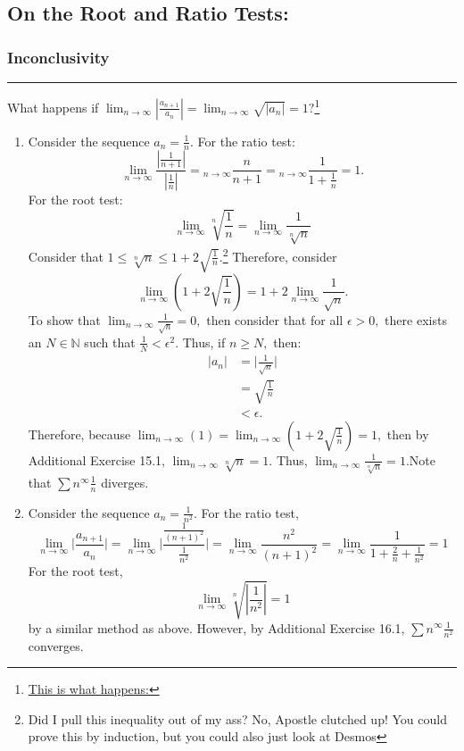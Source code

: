 \documentclass[openany, amssymb, psamsfonts]{amsart}
\newcommand{\bbN}{\mathbb{N}}
\newcommand{\abs}[1]{\lvert #1 \rvert}
\theoremstyle{definition}
\numberwithin{equation}{section}
\begin{document}
\subsection*{ On the Root and Ratio Tests:}
\subsubsection*{Inconclusivity}
\vspace{4pt}     \hrule   \vspace{4pt} What happens if $\lim_{n\to \infty}\left|\frac{a_{n+1}}{a_n}\right| = \lim_{n\to \infty}\sqrt{\abs{a_n}} = 1?$\footnote{ \href{https://media.istockphoto.com/id/1250210811/photo/depletion-resource-concept-hand-squeezed-planet-3d-illustration.jpg?s=612x612&w=0&k=20&c=jbRhcgL5VhpvcJCwIvY_q2s2pER0_BxTiMqeOrsMKEs=}{This is what happens:}}
\begin{enumerate}
    \item Consider the sequence $a_n = \frac{1}{n}.$ For the ratio test: \[\lim_{n\to \infty}\frac{|\frac{1}{n+1}|}{|\frac{1}{n}|} = \displaystyle_{n\to \infty} \frac{n}{n+1} = \displaystyle_{n\to \infty}\frac{1}{1 + \frac{1}{n}} = 1.\] For the root test: \[\displaystyle\lim_{n\to \infty} \sqrt[n]{\frac{1}{n}} = \displaystyle\lim_{n\to \infty}\displaystyle \frac{1}{\sqrt[n]{n}}\] Consider that $1\leq\sqrt[n]{n}\leq 1 + 2\sqrt{\frac{1}{n}}.$\footnote{Did I pull this inequality out of my ass? No, Apostle clutched up! You could prove this by induction, but you could also just look at Desmos}
    Therefore, consider \[\lim_{n\to \infty}(1 + 2\sqrt{\frac{1}{n}}) = 1 + 2\displaystyle\lim_{n\to \infty}\frac{1}{\sqrt{n}}.\] To show that $\lim_{n\to \infty}\frac{1}{\sqrt{n}} = 0,$ then consider that for all $\epsilon>0,$ there exists an $N \in \bbN$ such that $\frac{1}{N}< \epsilon^2.$ Thus, if $n\geq N,$ then:
    \begin{align*}
        \abs{a_n} &= \abs{\frac{1}{\sqrt{n}}}\\
        &= \sqrt{\frac{1}{n}}\\
        &< \epsilon.
    \end{align*}
    Therefore, because $\displaystyle\lim_{n\to \infty}(1) = \displaystyle\lim_{n\to \infty}(1 + 2\sqrt{\frac{1}{n}}) = 1,$ then by Additional Exercise 15.1, $\lim_{n\to \infty}\sqrt[n]{n} =1.$ Thus, $\displaystyle\lim_{n\to \infty}\frac{1}{\sqrt[n]{n}} = 1.$\newline Note that $\displaystyle\sum{n}^\infty\frac{1}{n}$ diverges. 
    \item Consider the sequence $a_n = \frac{1}{n^2}.$ For the ratio test, \[\displaystyle\lim_{n\to \infty}\abs{\frac{a_{n+1}}{a_n}} = \displaystyle\lim_{n\to \infty}\abs{\frac{\frac{1}{(n+1)^2}}{\frac{1}{n^2}}} = \displaystyle\lim_{n\to \infty}\frac{n^2}{(n+1)^2} = \displaystyle\lim_{n\to \infty}\frac{1}{1 + \frac{2}{n} + \frac{1}{n^2}} = 1\] For the root test, \[\displaystyle\lim_{n\to \infty}\sqrt[n]{\left|\frac{1}{n^2}\right|} = 1\] by a similar method as above. However, by Additional Exercise 16.1, $\displaystyle\sum{n}^\infty\frac{1}{n^2}$ converges. 
\end{enumerate}
\end{document}
